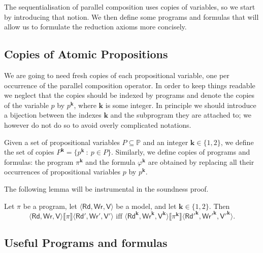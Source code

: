 \documentclass{llncs}
\newcommand{\cp}[2]{{#2}^\mathbf{#1}}
\newcommand{\pll}{ {||} }							%
\newcommand{\readset}{\mathsf{Rd}}
\newcommand{\valuset}{\mathsf{V}}
\newcommand{\writeset}{\mathsf{Wr}}
\newcommand{\intPgm}[1]{\llbracket #1 \rrbracket}
\renewcommand{\phi}{\varphi}
\newcommand{\propset}{\mathbb P}
\newcommand{\propsetOf}[1]{\propset_{#1}}
\newcommand{\set}[1]{\{#1\}}
\newcommand{\suchthat}{~ : ~}
\newcommand{\tuple}[1]{ \langle #1 \rangle}
\begin{document}
The sequentialisation of parallel composition uses copies of variables, so we start by introducing that notion. 
We then define some programs and formulas 
that will allow us to formulate the reduction axioms more concisely. 

\subsection{Copies of Atomic Propositions}\label{sec:copyVars}

We are going to need fresh copies of each propositional variable, one per occurrence of the parallel composition operator. 
In order to keep things readable we neglect that the copies should be indexed by programs
and denote the copies of the variable $p$ by $\cp k p$, where $\mathbf{k}$ is some integer. 
In principle we should introduce a bijection between the indexes $\mathbf{k}$ and the subprogram they are attached to;
we however do not do so to avoid overly complicated notations.

Given a set of propositional variables $P \subseteq \propset$ and an integer $\mathbf{k} \in \set{1,2}$, we define the set of copies
$\cp{k} P = \{ \cp{k} p \suchthat p \in P\}$. 
Similarly, we define copies of programs and formulas:
the program $\cp{k} \pi$ and the formula $\cp{k} \phi$ are obtained by replacing all their occurrences of
propositional variables $p$ by $\cp k p$. 

The following lemma will be instrumental in the soundness proof. 

\begin{lemma}\label{theo:copies}
Let $\pi$ be a program, 
let $\tuple{\readset,\writeset,\valuset}$ be a model, and 
let $\mathbf{k} \in \set{1,2}$. 
Then 
$$ \tuple{\readset,\writeset,\valuset} \intPgm{\pi} \tuple{\readset',\writeset',\valuset'} \text{ iff } 
\tuple{ \cp k {\readset},\cp k {\writeset},\cp k {\valuset}} \intPgm{\cp k \pi} \tuple{\cp k {\readset'},\cp k {\writeset'},\cp k {\valuset'}} . $$
\end{lemma}


\subsection{Useful Programs and formulas}\label{sec:usefulFml}
\end{document}
